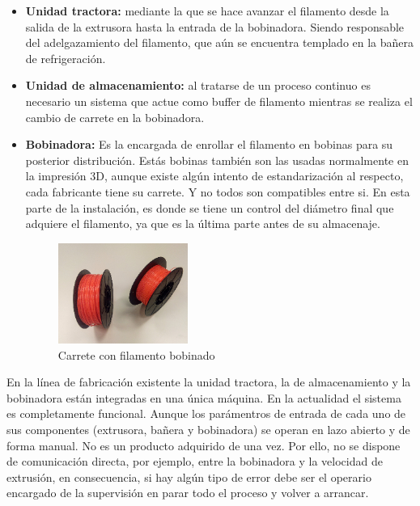 \begin{itemize}
\begin{figure}[H]
    	\label{fig:intro_bañera}
	\end{figure}
    \item \textbf{Unidad tractora:} mediante la que se hace avanzar el filamento desde la salida de la extrusora hasta la entrada de la bobinadora. Siendo responsable del adelgazamiento del filamento, que aún se encuentra templado en la bañera de refrigeración.
    \item \textbf{Unidad de almacenamiento:} al tratarse de un proceso continuo es necesario un sistema que actue como buffer de filamento mientras se realiza el cambio de carrete en la bobinadora.
    \item \textbf{Bobinadora:} Es la encargada de enrollar el filamento en bobinas para su posterior distribución. Estás bobinas también son las usadas normalmente en la impresión 3D, aunque existe algún intento de estandarización al respecto, cada fabricante tiene su carrete. Y no todos son compatibles entre si. En esta parte de la instalación, es donde se tiene un control del diámetro final que adquiere el filamento, ya que es la última parte antes de su almacenaje.
    \begin{figure}[H]
    	\centering
    	\includegraphics[width=0.4\textwidth]{images/carretes.png}
    	\caption{Carrete con filamento bobinado}
    	\label{fig:intro_carrete}
	\end{figure}
\end{itemize}

En la línea de fabricación existente la unidad tractora, la de almacenamiento y la bobinadora están integradas en una única máquina. En la actualidad el sistema es completamente funcional. Aunque los parámentros de entrada de cada uno de sus componentes (extrusora, bañera y bobinadora) se operan en lazo abierto y de forma manual. No es un producto adquirido de una vez. Por ello, no se dispone de comunicación directa, por ejemplo, entre la bobinadora y la velocidad de extrusión, en consecuencia, si hay algún tipo de error debe ser el operario encargado de la supervisión en parar todo el proceso y volver a arrancar.\\

